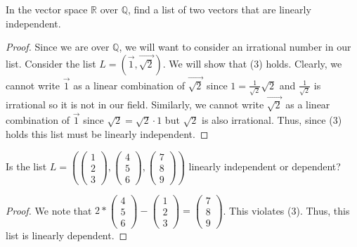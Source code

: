 \begin{exercise}
    In the vector space $\mathbb{R}$ over $\mathbb{Q}$, find a list of two vectors that are linearly independent.
\end{exercise}
\begin{proof}
    Since we are over $\mathbb{Q}$, we will want to consider an irrational number in our list. Consider the list $L=(\vec{1},\vec{\sqrt{2}})$. We will show that (3) holds. Clearly, we cannot write $\vec{1}$ as a linear combination of $\vec{\sqrt{2}}$ since $1=\frac{1}{\sqrt{2}}\sqrt{2}$ and $\frac{1}{\sqrt{2}}$ is irrational so it is not in our field. Similarly, we cannot write $\vec{\sqrt{2}}$ as a linear combination of $\vec{1}$ since $\sqrt{2}=\sqrt{2}\cdot 1$ but $\sqrt{2}$ is also irrational. Thus, since (3) holds this list must be linearly independent.
\end{proof}
\begin{exercise}
    Is the list $L=(\begin{pmatrix}
        1 \\ 2 \\ 3
    \end{pmatrix},\begin{pmatrix}
        4 \\ 5 \\ 6
    \end{pmatrix},\begin{pmatrix}
        7 \\ 8 \\ 9
    \end{pmatrix})$ linearly independent or dependent?
\end{exercise}
\begin{proof}
    We note that $2*\begin{pmatrix}
        4 \\ 5 \\ 6
    \end{pmatrix}-\begin{pmatrix}
        1 \\ 2 \\ 3
    \end{pmatrix}=\begin{pmatrix}
        7 \\ 8 \\ 9
    \end{pmatrix}$. This violates (3). Thus, this list is linearly dependent.
\end{proof}
